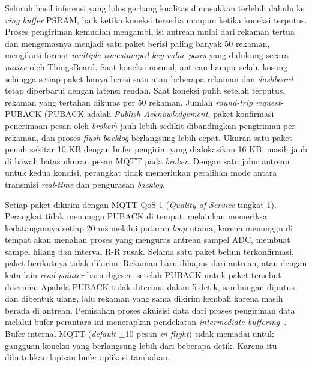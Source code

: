 Seluruh hasil inferensi yang lolos gerbang kualitas dimasukkan terlebih dahulu ke
\textit{ring buffer} PSRAM, baik ketika koneksi tersedia maupun ketika koneksi
terputus. Proses pengiriman kemudian mengambil isi antrean mulai dari rekaman
tertua dan mengemasnya menjadi satu paket berisi paling banyak 50 rekaman,
mengikuti format \textit{multiple timestamped key-value pairs} yang didukung
secara \textit{native} oleh ThingsBoard. Saat koneksi normal, antrean hampir selalu kosong
sehingga setiap paket hanya berisi satu atau beberapa rekaman dan \textit{dashboard}
tetap diperbarui dengan latensi rendah. Saat koneksi pulih setelah terputus,
rekaman yang tertahan dikuras per 50 rekaman. Jumlah \textit{round-trip}
\textit{request}-PUBACK (PUBACK adalah \textit{Publish Acknowledgement}, paket konfirmasi
penerimaan pesan oleh \textit{broker}) jauh lebih sedikit dibandingkan pengiriman per
rekaman, dan proses \textit{flush} \textit{backlog} berlangsung lebih cepat. Ukuran satu
paket penuh sekitar 10 KB dengan bufer pengirim yang dialokasikan 16 KB, masih jauh di bawah batas ukuran pesan
MQTT pada \textit{broker}. Dengan satu jalur antrean untuk kedua kondisi, perangkat tidak
memerlukan peralihan mode antara transmisi \textit{real-time} dan pengurasan
\textit{backlog}.

Setiap paket dikirim dengan MQTT QoS-1 (\textit{Quality of Service} tingkat 1).
Perangkat tidak menunggu PUBACK di tempat, melainkan memeriksa kedatangannya
setiap 20 ms melalui putaran \textit{loop} utama, karena menunggu di tempat akan menahan proses
yang menguras antrean sampel ADC, membuat sampel hilang dan interval R-R rusak.
Selama satu paket belum terkonfirmasi, paket berikutnya tidak dikirim. Rekaman
baru dihapus dari antrean, atau dengan kata lain \textit{read pointer} baru
digeser, setelah PUBACK untuk paket tersebut diterima. Apabila PUBACK tidak
diterima dalam 5 detik, sambungan diputus dan dibentuk ulang, lalu rekaman yang
sama dikirim kembali karena masih berada di antrean. Pemisahan
proses akuisisi data dari proses pengiriman data melalui bufer perantara ini
menerapkan pendekatan \textit{intermediate buffering}~\cite{tipparaju_2021}. Bufer internal MQTT
(\textit{default} $\pm$10 pesan \textit{in-flight}) tidak memadai untuk gangguan koneksi yang
berlangsung lebih dari beberapa detik. Karena itu dibutuhkan lapisan bufer aplikasi
tambahan.

